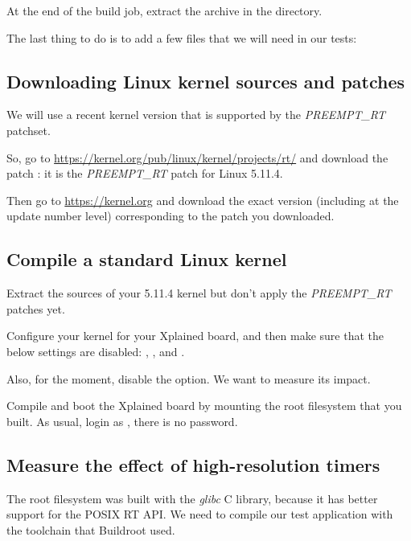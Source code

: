 At the end of the build job, extract the
 archive in the 
directory.

The last thing to do is to add a few files that we will need in our
tests:


\subsection{Downloading Linux kernel sources and patches}

We will use a recent kernel version that is supported by the {\em
  PREEMPT\_RT} patchset.

So, go to \url{https://kernel.org/pub/linux/kernel/projects/rt/} and
download the patch : it is the {\em
  PREEMPT\_RT} patch for Linux 5.11.4.

Then go to \url{https://kernel.org} and download the exact version
(including at the update number level) corresponding to the patch you
downloaded.

\subsection{Compile a standard Linux kernel}

Extract the sources of your 5.11.4 kernel but don't apply the {\em
  PREEMPT\_RT} patches yet.

Configure your kernel for your Xplained board, and then make sure
that the below settings are disabled:
, ,
 and .

Also, for the moment, disable the 
option. We want to measure its impact.

Compile and boot the Xplained board by mounting the root filesystem that you
built. As usual, login as , there is no password.

\subsection{Measure the effect of high-resolution timers}

The root filesystem was built with the {\em glibc} C library, because
it has better support for the POSIX RT API. We need to compile our
test application with the toolchain that Buildroot used.

